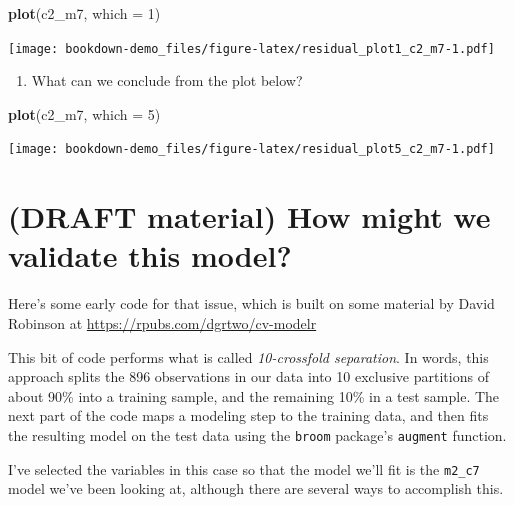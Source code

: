 \documentclass[]{book}
\newenvironment{Shaded}{\begin{snugshade}}{\end{snugshade}}
\newcommand{\KeywordTok}[1]{\textcolor[rgb]{0.13,0.29,0.53}{\textbf{#1}}}
\newcommand{\DataTypeTok}[1]{\textcolor[rgb]{0.13,0.29,0.53}{#1}}
\newcommand{\DecValTok}[1]{\textcolor[rgb]{0.00,0.00,0.81}{#1}}
\newcommand{\NormalTok}[1]{#1}
\providecommand{\tightlist}{%
  \setlength{\itemsep}{0pt}\setlength{\parskip}{0pt}}
\theoremstyle{definition}
\theoremstyle{definition}
\theoremstyle{definition}
\theoremstyle{remark}
\begin{document}
\begin{Shaded}
\begin{Highlighting}[]
\KeywordTok{plot}\NormalTok{(c2_m7, }\DataTypeTok{which =} \DecValTok{1}\NormalTok{)}
\end{Highlighting}
\end{Shaded}

\texttt{[image: bookdown-demo\_files/figure-latex/residual\_plot1\_c2\_m7-1.pdf]}

\begin{enumerate}
\def\labelenumi{\arabic{enumi}.}
\setcounter{enumi}{1}
\tightlist
\item
  What can we conclude from the plot below?
\end{enumerate}

\begin{Shaded}
\begin{Highlighting}[]
\KeywordTok{plot}\NormalTok{(c2_m7, }\DataTypeTok{which =} \DecValTok{5}\NormalTok{)}
\end{Highlighting}
\end{Shaded}

\texttt{[image: bookdown-demo\_files/figure-latex/residual\_plot5\_c2\_m7-1.pdf]}

\section{(DRAFT material) How might we validate this
model?}\label{draft-material-how-might-we-validate-this-model}

Here's some early code for that issue, which is built on some material
by David Robinson at \url{https://rpubs.com/dgrtwo/cv-modelr}

This bit of code performs what is called \emph{10-crossfold separation}.
In words, this approach splits the 896 observations in our data into 10
exclusive partitions of about 90\% into a training sample, and the
remaining 10\% in a test sample. The next part of the code maps a
modeling step to the training data, and then fits the resulting model on
the test data using the \texttt{broom} package's \texttt{augment}
function.

I've selected the variables in this case so that the model we'll fit is
the \texttt{m2\_c7} model we've been looking at, although there are
several ways to accomplish this.
\end{document}
